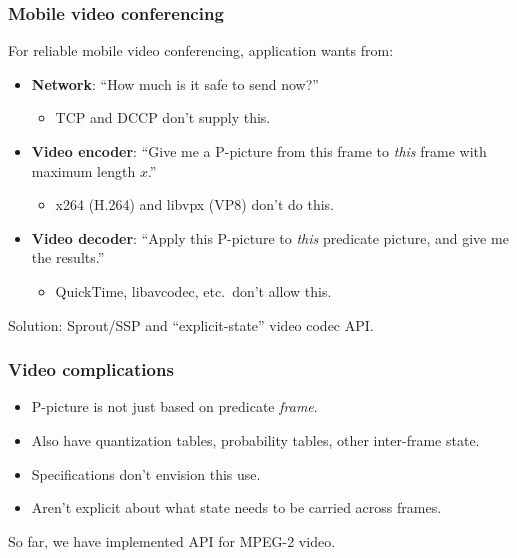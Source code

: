 \documentclass[svgnames]{beamer}
\begin{document}
\begin{frame}
\frametitle{Mobile video conferencing}

For reliable mobile video conferencing, application wants from:

\begin{itemize}
\item \textbf{Network}: ``How much is it safe to send now?''

\begin{itemize}
\item TCP and DCCP don't supply this.
\end{itemize}

\item \textbf{Video encoder}: ``Give me a P-picture from this frame
to \emph{this} frame with maximum length $x$.''

\begin{itemize}
\item x264 (H.264) and libvpx (VP8) don't do this.
\end{itemize}

\item \textbf{Video decoder}: ``Apply this P-picture to \emph{this}
predicate picture, and give me the results.''

\begin{itemize}
\item QuickTime, libavcodec, etc.~don't allow this.
\end{itemize}

\end{itemize}

Solution: Sprout/SSP and ``explicit-state'' video codec API.

\end{frame}

\begin{frame}
\frametitle{Video complications}

\begin{itemize}
\item P-picture is not just based on predicate \emph{frame}.

\item Also have quantization tables, probability tables, other
  inter-frame state.

\item Specifications don't envision this use.

\item Aren't explicit about what state needs to be carried across
  frames.

\end{itemize}

So far, we have implemented API for MPEG-2 video.

\end{frame}
\end{document}
